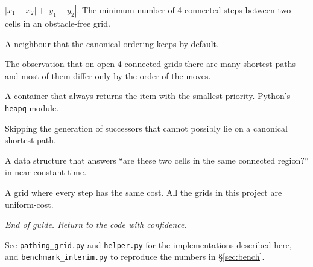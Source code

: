 \documentclass[11pt,a4paper]{article}
\begin{document}
\begin{description}[leftmargin=130pt, style=nextline]
  \item[\textbf{Manhattan distance}] $|x_1 - x_2| + |y_1 - y_2|$. The minimum number of 4-connected steps between two cells in an obstacle-free grid.
  \item[\textbf{Natural neighbour}] A neighbour that the canonical ordering keeps by default.
  \item[\textbf{Path-symmetry problem}] The observation that on open 4-connected grids there are many shortest paths and most of them differ only by the order of the moves.
  \item[\textbf{Priority queue}] A container that always returns the item with the smallest priority. Python's \texttt{heapq} module.
  \item[\textbf{Pruning}] Skipping the generation of successors that cannot possibly lie on a canonical shortest path.
  \item[\textbf{Union-Find}] A data structure that answers ``are these two cells in the same connected region?'' in near-constant time.
  \item[\textbf{Uniform-cost grid}] A grid where every step has the same cost. All the grids in this project are uniform-cost.
\end{description}

\vspace{1em}
\begin{center}
\itshape End of guide. Return to the code with confidence.\par
\small See \texttt{pathing\_grid.py} and \texttt{helper.py} for the implementations described here,\\
and \texttt{benchmark\_interim.py} to reproduce the numbers in \S\ref{sec:bench}.
\end{center}
\end{document}
